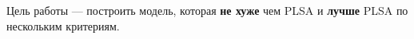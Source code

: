 \documentclass[12pt,twoside]{article}
\begin{document}
	Цель работы --- построить модель, которая {\bf не хуже} чем PLSA\cite{Hofmann:1999:PLS:2073796.2073829} и {\bf лучше} PLSA по нескольким критериям.
	
	
	
	
	
	
	
	
	
	
\end{document}
